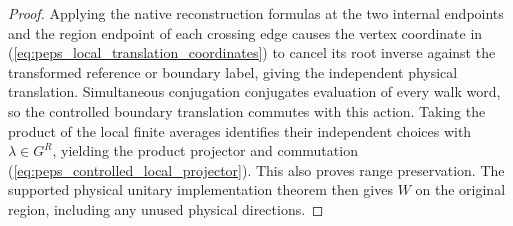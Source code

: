 \begin{proof}\leanok
    Applying the native reconstruction formulas at the two internal endpoints
    and the region endpoint of each crossing edge causes the vertex coordinate
    in (\ref{eq:peps_local_translation_coordinates}) to cancel its root inverse against the transformed reference
    or boundary label, giving the independent physical translation.
    Simultaneous conjugation conjugates evaluation of every walk
    word, so the controlled boundary translation commutes with this action.
    Taking the product of the local finite averages identifies their
    independent choices with $\lambda\in G^R$, yielding the product
    projector and commutation (\ref{eq:peps_controlled_local_projector}). This also proves range preservation.
    The supported physical unitary implementation theorem then gives $W$ on the
    original region, including any unused physical directions.
\end{proof}

